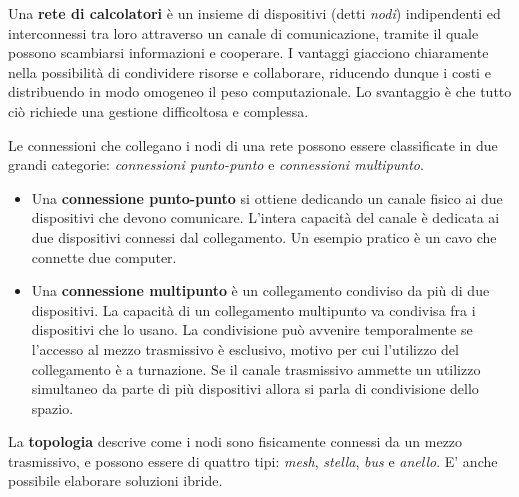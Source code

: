 Una \textbf{rete di calcolatori} è un insieme di dispositivi (detti \textit{nodi}) indipendenti ed interconnessi tra loro attraverso un canale di comunicazione, tramite il quale possono scambiarsi informazioni e cooperare. I vantaggi giacciono chiaramente nella possibilità di condividere risorse e collaborare, riducendo dunque i costi e distribuendo in modo omogeneo il peso computazionale. Lo svantaggio è che tutto ciò richiede una gestione difficoltosa e complessa.

\vspace{3mm}

Le connessioni che collegano i nodi di una rete possono essere classificate in due
grandi categorie: \textit{connessioni punto-punto} e \textit{connessioni multipunto}.

\begin{itemize}
    \item 
    Una \textbf{connessione punto-punto} si ottiene dedicando un canale fisico ai due dispositivi che devono comunicare. L’intera capacità del canale è dedicata ai due dispositivi connessi dal
    collegamento. Un esempio pratico è un cavo che connette due computer.
    
    \item
    Una \textbf{connessione multipunto} è un collegamento condiviso da più di due dispositivi. La capacità di un collegamento multipunto va condivisa fra i dispositivi che lo usano. La condivisione può avvenire temporalmente se l’accesso al mezzo trasmissivo è esclusivo, motivo per cui l'utilizzo del collegamento è a turnazione. Se il canale trasmissivo ammette un utilizzo simultaneo da parte di più dispositivi allora si parla di condivisione dello spazio.
\end{itemize}

La \textbf{topologia} descrive come i nodi sono fisicamente connessi da un mezzo trasmissivo, e possono essere di quattro tipi: \textit{mesh}, \textit{stella}, \textit{bus} e \textit{anello}. E' anche possibile elaborare soluzioni ibride.

